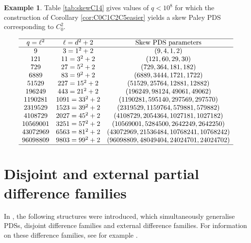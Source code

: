 \documentclass[12pt, a4paper]{article}
\theoremstyle{definition}
\newtheorem{example}[theorem]{Example}
\begin{document}
\begin{example}
Table \ref{tab:skewC14} gives values of $q<10^8$ for which the construction of Corollary \ref{cor:C0C1C2C5easier} yields a skew Paley PDS corresponding to $C_0^2$.

\begin{table}[h]
	\centering
	\[
	\begin{array}{ccc}
		\hline
		q=\ell^2 & \ell=d^2+2 & \text{Skew PDS parameters} \\
		\hline
		9 & 3=1^2+2 & (9,4,1,2) \\
		121 & 11=3^2+2 & (121,60,29,30) \\
		729 & 27=5^2+2 & (729,364,181,182) \\
		6889 & 83=9^2+2 & (6889,3444,1721,1722) \\
		51529 & 227=15^2+2 & (51529,25764,12881,12882) \\
		196249 & 443=21^2+2 & (196249,98124,49061,49062) \\
		1190281 & 1091=33^2+2 & (1190281,595140,297569,297570) \\
		2319529 & 1523=39^2+2 & (2319529,1159764,579881,579882) \\
		4108729 & 2027=45^2+2 & (4108729,2054364,1027181,1027182) \\
		10569001 & 3251=57^2+2 & (10569001,5284500,2642249,2642250) \\
		43072969 & 6563=81^2+2 & (43072969,21536484,10768241,10768242) \\
		96098809 & 9803=99^2+2 & (96098809,48049404,24024701,24024702) \\
		\hline
	\end{array}
	\]
	\caption{Skew PDSs from Corollary \ref{cor:C0C1C2C5easier}.}
	\label{tab:skewC14}
\end{table} 
\end{example}



\section{Disjoint and external partial difference families}

In \cite{HucJoh}, the following structures were introduced, which simultaneously generalise PDSs, disjoint difference families and external difference families.  For information on these difference families, see for example \cite{Bur,PatSti}.
\end{document}
